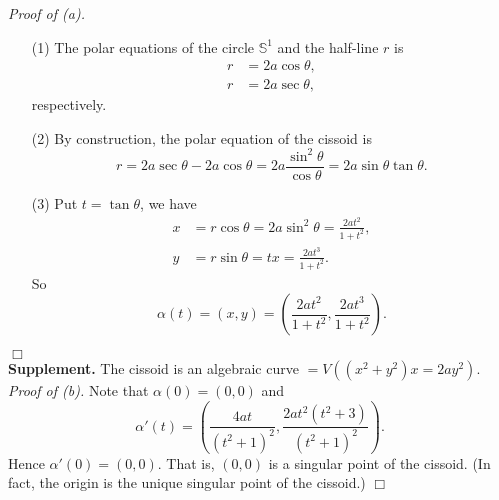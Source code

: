 \documentclass{article}
\begin{document}
\emph{Proof of (a).}
\begin{enumerate}
\item[(1)]
  The polar equations of the circle $\mathbb{S}^1$ and the half-line $r$ is
  \begin{align*}
    r &= 2a\cos\theta, \\
    r &= 2a\sec\theta,
  \end{align*}
  respectively.

\item[(2)]
  By construction, the polar equation of the cissoid is
  \[
    r
    = 2a\sec\theta - 2a\cos\theta
    = 2a\frac{\sin^2\theta}{\cos\theta}
    = 2a\sin\theta \tan\theta.
  \]

\item[(3)]
  Put $t = \tan\theta$, we have
  \begin{align*}
    x &= r \cos\theta = 2a \sin^2 \theta = \frac{2at^2}{1+t^2}, \\
    y &= r \sin\theta = tx = \frac{2at^3}{1+t^2}.
  \end{align*}
  So
  \[
    \alpha(t) = (x,y) = \left( \frac{2at^2}{1+t^2}, \frac{2at^3}{1+t^2} \right).
  \]
\end{enumerate}
$\Box$ \\

\textbf{Supplement.}
The cissoid is an algebraic curve $= V((x^2+y^2)x = 2ay^2)$. \\



\emph{Proof of (b).}
Note that $\alpha(0) = (0,0)$ and
\[
  \alpha'(t) = \left( \frac{4at}{(t^2+1)^2}, \frac{2at^2(t^2+3)}{(t^2+1)^2} \right).
\]
Hence $\alpha'(0) = (0,0)$. That is, $(0,0)$ is a singular point of the cissoid.
(In fact, the origin is the unique singular point of the cissoid.)
$\Box$ \\
\end{document}
